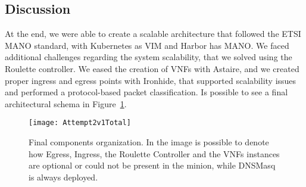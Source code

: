 \subsection{Discussion}
At the end, we were able to create a scalable architecture that followed the
ETSI MANO standard, with Kubernetes as VIM and Harbor has MANO. We faced
additional challenges regarding the system scalability, that we solved using the
Roulette controller. We eased the creation of VNFs with Astaire, and we created
proper ingress and egress points with Ironhide, that supported scalability
issues and performed a protocol-based packet classification. Is possible to see
a final architectural schema in
Figure~\ref{chap:archimpl:sec:secondattempt:img:attempt2v1total}.

\begin{figure}[t]
  \centering
  \texttt{[image: Attempt2v1Total]}
  \caption[Final components organization]{Final components organization. In the
    image is possible to denote how Egress, Ingress, the Roulette Controller and
    the VNFs instances are optional or could not be present in the minion, while
    DNSMasq is always deployed.}
  \label{chap:archimpl:sec:secondattempt:img:attempt2v1total}
\end{figure}
